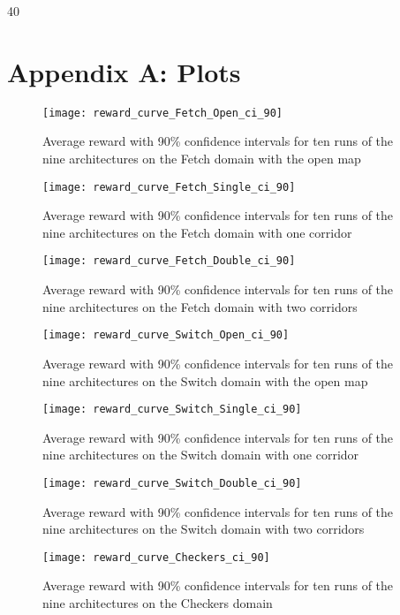 \documentclass{article}
\begin{document}
\begin{SCfigure}
\begin{thebibliography}{40}
\end{thebibliography}

\newpage


\section*{Appendix A: Plots}


\begin{figure}[h!]
\centering
\texttt{[image: reward\_curve\_Fetch\_Open\_ci\_90]}
\caption{Average reward with 90\% confidence intervals for ten runs of the nine architectures on the Fetch domain with the open map}
\end{figure}
\begin{figure}[h!]
\centering
\texttt{[image: reward\_curve\_Fetch\_Single\_ci\_90]}
\caption{Average reward with 90\% confidence intervals for ten runs of the nine architectures on the Fetch domain with one corridor}
\end{figure}
\begin{figure}[h!]
\centering
\texttt{[image: reward\_curve\_Fetch\_Double\_ci\_90]}
\caption{Average reward with 90\% confidence intervals for ten runs of the nine architectures on the Fetch domain with two corridors}
\end{figure}
\begin{figure}[h!]
\centering
\texttt{[image: reward\_curve\_Switch\_Open\_ci\_90]}
\caption{Average reward with 90\% confidence intervals for ten runs of the nine architectures on the Switch domain with the open map}
\end{figure}
\begin{figure}[h!]
\centering
\texttt{[image: reward\_curve\_Switch\_Single\_ci\_90]}
\caption{Average reward with 90\% confidence intervals for ten runs of the nine architectures on the Switch domain with one corridor}
\end{figure}

\begin{figure}[h!]
\centering
\texttt{[image: reward\_curve\_Switch\_Double\_ci\_90]}
\caption{Average reward with 90\% confidence intervals for ten runs of the nine architectures on the Switch domain with two corridors}
\end{figure}

\begin{figure}[h!]
\centering
\texttt{[image: reward\_curve\_Checkers\_ci\_90]}
\caption{Average reward with 90\% confidence intervals for ten runs of the nine architectures on the Checkers domain}
\end{figure}








\end{SCfigure}
\end{document}
